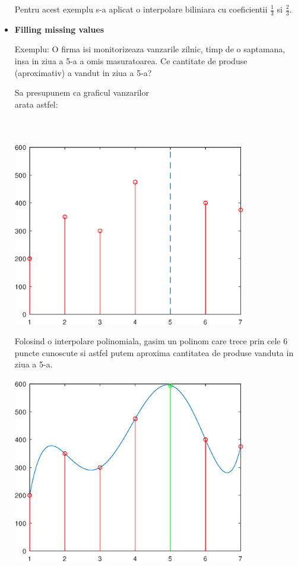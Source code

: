 \documentclass{article}
\begin{document}
\begin{itemize}
     
    Pentru acest exemplu s-a aplicat o interpolare biliniara
    \framebox[0.3cm][r]{\footnotemark} cu coeficientii $\frac{1}{3}$ si $\frac{2}{3}$.

    \item \textbf {Filling missing values}
    
    \tabto{0.5cm} Exemplu: O firma isi monitorizeaza vanzarile zilnic, timp de o saptamana, insa in ziua a 5-a a omis masuratoarea. Ce cantitate de produse (aproximativ) a vandut in ziua a 5-a? \\
    
    \begin{minipage}{0.5\textwidth}
        \tabto{0.5cm} Sa presupunem ca graficul vanzarilor\\
        arata astfel:\\\\\\\\
        \includegraphics[width=0.8\textwidth]{sales_before}
    \end{minipage}
    \begin{minipage}{0.5\textwidth}
        \tabto{0.5cm} Folosind o interpolare polinomiala, gasim un polinom care trece prin cele 6 puncte cunoscute si astfel putem aproxima cantitatea de produse vanduta in ziua a 5-a.\\\\
        \includegraphics[width=0.8\textwidth]{sales_after}
    \end{minipage}
    
\end{itemize}
\end{document}
